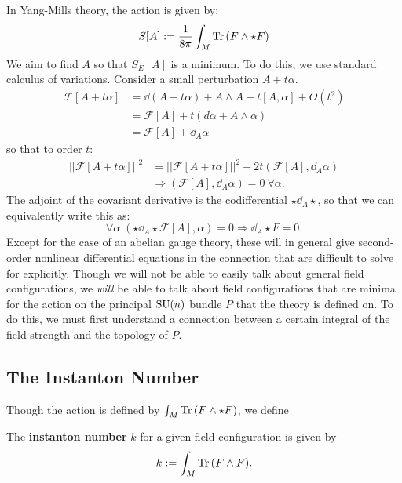 In Yang-Mills theory, the action is given by:
\begin{equation}
	S[A] := \frac{1}{8\pi} \int_M \mathrm{Tr}\,(F \wedge \star F)
\end{equation}
We aim to find $A$ so that $S_E[A]$ is a minimum. To do this, we use standard calculus of variations. Consider a small perturbation $A + t \alpha$.
		\begin{equation*}
			\begin{aligned}
				\mathcal F[A + t \alpha] &= \dd (A + t \alpha) + A \wedge A + t [A, \alpha] + O(t^2) \\
				&= \mathcal F[A] + t (d \alpha + A \wedge \alpha)\\
				&= \mathcal F[A] + \dd_{A} \alpha
			\end{aligned}
		\end{equation*}
		so that to order $t$:
		\begin{equation*}
			\begin{aligned}
				||\mathcal F[A + t \alpha]||^2 &= ||\mathcal F[A + t \alpha]||^2 + 2 t (\mathcal F[A], \dd_{A} \alpha)\\
				&\Rightarrow (\mathcal F[A], \dd_{A} \alpha) = 0 ~ \forall \alpha.
			\end{aligned}
		\end{equation*}
		The adjoint of the covariant derivative is the codifferential $\star \dd_A \star$, so that we can equivalently write this as:
		\[
			\forall \alpha \; (\star \dd_A \star \mathcal F[A], \alpha) = 0 \Rightarrow \dd_A \star F = 0.
		\]
		Except for the case of an abelian gauge theory, these will in general give second-order nonlinear differential equations in the connection that are difficult to solve for explicitly. Though we will not be able to easily talk about general field configurations, we \emph{will} be able to talk about field configurations that are minima for the action on the principal $\mathrm{SU}(n)$ bundle $P$ that the theory is defined on. To do this, we must first understand a connection between a certain integral of the field strength and the topology of $P$.


\subsection{The Instanton Number} %
\label{sub:the_instanton_number}

		Though the action is defined by $\int_M \mathrm{Tr}\,(F \wedge \star F)$, we define
		\begin{defn}
			The \textbf{instanton number} $k$ for a given field configuration is given by
			\begin{equation}
				k := \int_M \mathrm{Tr}\,(F \wedge F).
			\end{equation}
		\end{defn}

